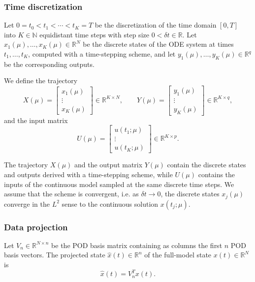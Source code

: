 \documentclass{article}
\begin{document}
\vspace{1cm}

\subsubsection*{Time discretization}

Let $0 = t_0 < t_1 < \cdots < t_K = T$ be the discretization of the time domain $[0,T]$ into 
$K \in \mathbb{N}$ equidistant time steps with step size $0 < \delta t \in \mathbb{R}$.  
Let $x_1(\mu), \dots, x_K(\mu) \in \mathbb{R}^N$ be the discrete states of the ODE system at 
times $t_1,\dots,t_K$, computed with a time-stepping scheme, and let 
$y_1(\mu), \dots, y_K(\mu) \in \mathbb{R}^q$ be the corresponding outputs.  

We define the trajectory
\[
X(\mu) = 
\begin{bmatrix}
x_1(\mu) \\
\vdots \\
x_K(\mu)
\end{bmatrix}
\in \mathbb{R}^{K \times N},
\qquad
Y(\mu) = 
\begin{bmatrix}
y_1(\mu) \\
\vdots \\
y_K(\mu)
\end{bmatrix}
\in \mathbb{R}^{K \times q},
\]
and the input matrix
\[
U(\mu) = 
\begin{bmatrix}
u(t_1;\mu) \\
\vdots \\
u(t_K;\mu)
\end{bmatrix}
\in \mathbb{R}^{K \times p}.
\]

The trajectory $X(\mu)$ and the output matrix $Y(\mu)$ contain the discrete states and outputs 
derived with a time-stepping scheme, while $U(\mu)$ contains the inputs of the continuous model 
sampled at the same discrete time steps.  
We assume that the scheme is convergent, i.e. as $\delta t \to 0$, the discrete states $x_j(\mu)$ 
converge in the $L^2$ sense to the continuous solution $x(t_j;\mu)$.  

\vspace{1cm}


\subsubsection*{Data projection}

Let $V_n \in \mathbb{R}^{N \times n}$ be the POD basis matrix containing as columns the first $n$ POD basis vectors.  
The projected state $\hat{x}(t) \in \mathbb{R}^n$ of the full-model state $x(t) \in \mathbb{R}^N$ is
\[
\hat{x}(t) = V_n^T x(t).
\]
\end{document}
